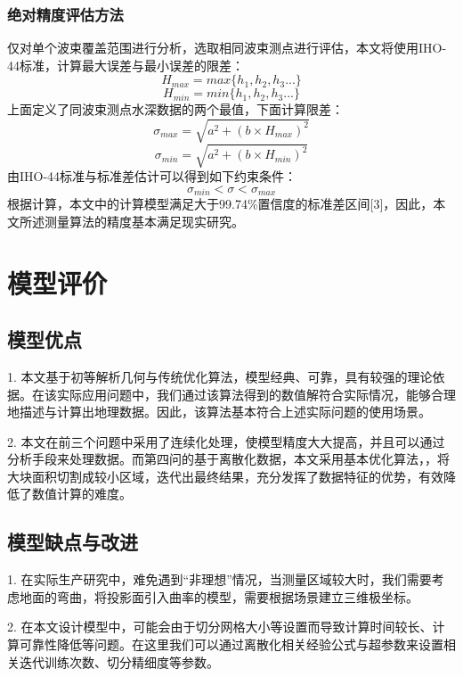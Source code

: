 \documentclass[withoutpreface,bwprint]{cumcmthesis} %
\begin{document}
\subsubsection{绝对精度评估方法}
仅对单个波束覆盖范围进行分析，选取相同波束测点进行评估，本文将使用IHO-44标准，计算最大误差与最小误差的限差：
\begin{equation}
H_{max}=max\{h_1,h_2,h_3...\}
\end{equation}
\begin{equation}
H_{min}=min\{h_1,h_2,h_3...\}
\end{equation}
上面定义了同波束测点水深数据的两个最值，下面计算限差：
\begin{equation}
\sigma_{max}=\sqrt{a^2+(b\times H_{max})^2}
\end{equation}
\begin{equation}
\sigma_{min}=\sqrt{a^2+(b\times H_{min})^2}
\end{equation}
由IHO-44标准与标准差估计可以得到如下约束条件：
\begin{equation}
\sigma_{min}<\sigma<\sigma_{max}
\end{equation}
根据计算，本文中的计算模型满足大于99.74\%置信度的标准差区间[3]，因此，本文所述测量算法的精度基本满足现实研究。
\section{模型评价}

\subsection{模型优点}
1. 本文基于初等解析几何与传统优化算法，模型经典、可靠，具有较强的理论依据。在该实际应用问题中，我们通过该算法得到的数值解符合实际情况，能够合理地描述与计算出地理数据。因此，该算法基本符合上述实际问题的使用场景。

2. 本文在前三个问题中采用了连续化处理，使模型精度大大提高，并且可以通过分析手段来处理数据。而第四问的基于离散化数据，本文采用基本优化算法，，将大块面积切割成较小区域，迭代出最终结果，充分发挥了数据特征的优势，有效降低了数值计算的难度。

\subsection{模型缺点与改进}
1. 在实际生产研究中，难免遇到“非理想”情况，当测量区域较大时，我们需要考虑地面的弯曲，将投影面引入曲率的模型，需要根据场景建立三维极坐标。

2. 在本文设计模型中，可能会由于切分网格大小等设置而导致计算时间较长、计算可靠性降低等问题。在这里我们可以通过离散化相关经验公式与超参数来设置相关迭代训练次数、切分精细度等参数。
\end{document}
